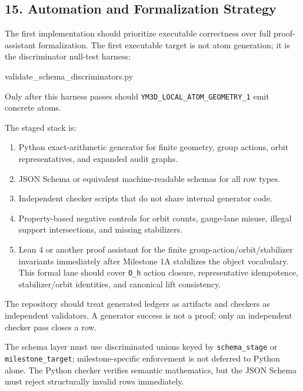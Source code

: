 \documentclass[
]{article}
\newenvironment{Shaded}{}{}
\newcommand{\NormalTok}[1]{#1}
\providecommand{\tightlist}{%
  \setlength{\itemsep}{0pt}\setlength{\parskip}{0pt}}
\begin{document}
\subsection{15. Automation and Formalization
Strategy}\label{automation-and-formalization-strategy}

The first implementation should prioritize executable correctness over
full proof-assistant formalization. The first executable target is not
atom generation; it is the discriminator null-test harness:

\begin{Shaded}
\begin{Highlighting}[]
\NormalTok{validate\_schema\_discriminators.py}
\end{Highlighting}
\end{Shaded}

Only after this harness passes should
\texttt{YM3D\_LOCAL\_ATOM\_GEOMETRY\_1} emit concrete atoms.

The staged stack is:

\begin{enumerate}
\def\labelenumi{\arabic{enumi}.}
\tightlist
\item
  Python exact-arithmetic generator for finite geometry, group actions,
  orbit representatives, and expanded audit graphs.
\item
  JSON Schema or equivalent machine-readable schemas for all row types.
\item
  Independent checker scripts that do not share internal generator code.
\item
  Property-based negative controls for orbit counts, gauge-lane misuse,
  illegal support intersections, and missing stabilizers.
\item
  Lean 4 or another proof assistant for the finite
  group-action/orbit/stabilizer invariants immediately after Milestone
  1A stabilizes the object vocabulary. This formal lane should cover
  \texttt{O\_h} action closure, representative idempotence,
  stabilizer/orbit identities, and canonical lift consistency.
\end{enumerate}

The repository should treat generated ledgers as artifacts and checkers
as independent validators. A generator success is not a proof; only an
independent checker pass closes a row.

The schema layer must use discriminated unions keyed by
\texttt{schema\_stage} or \texttt{milestone\_target}; milestone-specific
enforcement is not deferred to Python alone. The Python checker verifies
semantic mathematics, but the JSON Schema must reject structurally
invalid rows immediately.
\end{document}
